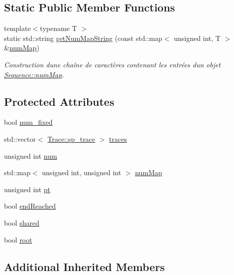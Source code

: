 \subsection*{Static Public Member Functions}
\begin{DoxyCompactItemize}
\item 
{\footnotesize template$<$typename T $>$ }\\static std\+::string \hyperlink{class_sequence_a161ac4fab17750ca48b1fe5053bc1c98}{get\+Num\+Map\+String} (const std\+::map$<$ unsigned int, T $>$ \&\hyperlink{class_sequence_a3fb6b6543259ea07c976012dd622cdcc}{num\+Map})
\begin{DoxyCompactList}\small\item\em Construction d\textquotesingle{}une chaîne de caractères contenant les entrées d\textquotesingle{}un objet \hyperlink{class_sequence_a3fb6b6543259ea07c976012dd622cdcc}{Sequence\+::num\+Map}. \end{DoxyCompactList}\end{DoxyCompactItemize}
\subsection*{Protected Attributes}
\begin{DoxyCompactItemize}
\item 
bool \hyperlink{class_sequence_ae495f3d3267ac936660920ab13b2316e}{num\+\_\+fixed}
\item 
std\+::vector$<$ \hyperlink{class_trace_a9c58e523529fc8a03fb6acf3eef86150}{Trace\+::sp\+\_\+trace} $>$ \hyperlink{class_sequence_a2e22b6d3eda29911dda95aa36efefa83}{traces}
\item 
unsigned int \hyperlink{class_sequence_a9283bd1da021b06eeaed1028b1e7069e}{num}
\item 
std\+::map$<$ unsigned int, unsigned int $>$ \hyperlink{class_sequence_a3fb6b6543259ea07c976012dd622cdcc}{num\+Map}
\item 
unsigned int \hyperlink{class_sequence_a6005aee7fd142d6292dcfeefe062bc82}{pt}
\item 
bool \hyperlink{class_sequence_a37ae535e71d53216a85e16bec941410d}{end\+Reached}
\item 
bool \hyperlink{class_sequence_a77c5ea96e0222cb80d5a8cf420e1d624}{shared}
\item 
bool \hyperlink{class_sequence_ac09da762e43cc657842d4f953ffff613}{root}
\end{DoxyCompactItemize}
\subsection*{Additional Inherited Members}



